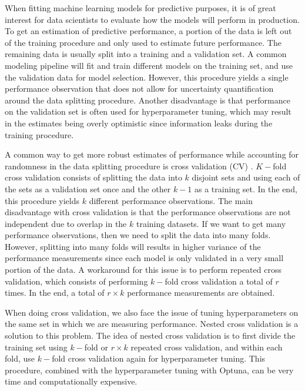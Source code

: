 \documentclass[11pt,a4paper]{article}
\theoremstyle{plain}
\theoremstyle{definition}
\begin{document}
When fitting machine learning models for predictive purposes, it is of great interest for data scientists to evaluate how the models will perform in production. To get an estimation of predictive performance, a portion of the data is left out of the training procedure and only used to estimate future performance. The remaining data is usually split into a training and a validation set. A common modeling pipeline will fit and train different models on the training set, and use the validation data for model selection. However, this procedure yields a single performance observation that does not allow for uncertainty quantification around the data splitting procedure. Another disadvantage is that performance on the validation set is often used for hyperparameter tuning, which may result in the estimates being overly optimistic since information leaks during the training procedure.

A common way to get more robust estimates of performance while accounting for randomness in the data splitting procedure is cross validation (CV) \citep{esl}. $K-$fold cross validation consists of splitting the data into $k$ disjoint sets and using each of the sets as a validation set once and the other $k-1$ as a training set. In the end, this procedure yields $k$ different performance observations. The main disadvantage with cross validation is that the performance observations are not independent due to overlap in the $k$ training datasets. If we want to get many performance observations, then we need to split the data into many folds. However, splitting into many folds will results in higher variance of the performance measurements since each model is only validated in a very small portion of the data. A workaround for this issue is to perform repeated cross validation, which consists of performing $k-$fold cross validation a total of $r$ times. In the end, a total of $r \times k$ performance measurements are obtained.

When doing cross validation, we also face the issue of tuning hyperparameters on the same set in which we are measuring performance. Nested cross validation is a solution to this problem. The idea of nested cross validation is to first divide the training set using $k-$fold or $r\times k$ repeated cross validation, and within each fold, use $k-$fold cross validation again for hyperparameter tuning. This procedure, combined with the hyperparameter tuning with Optuna, can be very time and computationally expensive.
\end{document}
